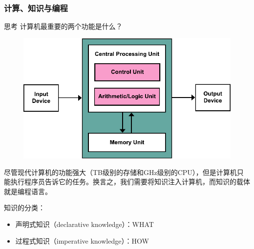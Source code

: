 \documentclass[aspectratio=169, 14pt]{beamer}
\begin{document}
\begin{frame}
	\frametitle{计算、知识与编程}

	\begin{exampleblock}{思考}
		计算机最重要的两个功能是什么？
	\end{exampleblock}
	\begin{figure}
		\includegraphics[height=.6\paperheight]{week1/Von_Neumann_Architecture}
	\end{figure}
\end{frame}

\begin{frame}[fragile]
	尽管现代计算机的功能强大（TB级别的存储和GHz级别的CPU），但是计算机只能执行程序员告诉它的任务。换言之，我们需要将\alert{知识注入计算机}，而知识的载体就是编程语言。

	\pause
	知识的分类：

	\begin{itemize}
		\item \alert{声明式知识}（declarative knowledge）：WHAT
		\item \alert{过程式知识}（imperative knowledge）：HOW
	\end{itemize}


\end{frame}
\end{document}
